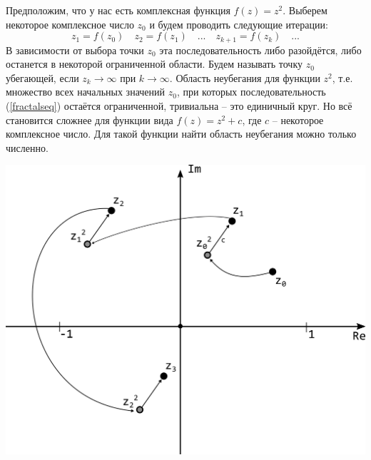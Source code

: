 \documentclass{article}
\begin{document}
Предположим, что у нас есть комплексная функция $f(z) = z^2$. Выберем некоторое комплексное число $z_0$ и будем проводить следующие итерации: 
\begin{equation*}
\label{fractalseq}
z_1 = f(z_0)\quad z_2 = f(z_1)\quad ...\quad z_{k+1} = f(z_k)\quad ...
\end{equation*}
В зависимости от выбора точки $z_0$ эта последовательность либо разойдётся, либо останется в некоторой ограниченной области. Будем называть точку $z_0$ убегающей, если $z_k \rightarrow \infty$ при $k \rightarrow \infty$. Область неубегания для функции $z^2$, т.е. множество всех начальных значений $z_0$, при которых последовательность (\ref{fractalseq}) остаётся ограниченной, тривиальна -- это единичный круг. Но всё становится сложнее для функции вида $f(z) = z^2 + c$, где $c$ -- некоторое комплексное число. Для такой функции найти область неубегания можно только численно.

\begin{center}
\includegraphics[scale=0.6]{../images/complexplane.png}
\end{center}
\end{document}
